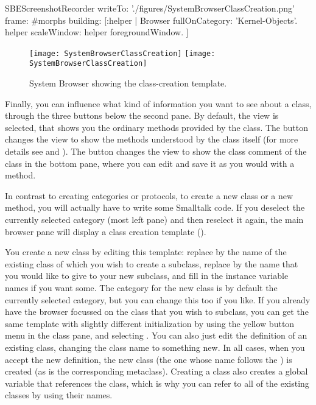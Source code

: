 \documentclass[a4paper,10pt,twoside]{book}
\begin{document}
\begin{ExecuteSmalltalkScript}
SBEScreenshotRecorder writeTo: './figures/SystemBrowserClassCreation.png' frame: #morphs building: [:helper |
	Browser fullOnCategory: 'Kernel-Objects'.
	helper scaleWindow: helper foregroundWindow.
]
\end{ExecuteSmalltalkScript}
\begin{figure}[htbp]
   \centering
   \ifluluelse
	   {\texttt{[image: SystemBrowserClassCreation]}}
	   {\texttt{[image: SystemBrowserClassCreation]}}
   \caption{System Browser showing the class-creation template.
   \label{fig:SystemBrowserClassCreation}}
\end{figure}

Finally, you can influence what kind of information you want to see about a class, through the three buttons below the second pane.
By default, the  view is selected, that shows you the ordinary methods provided by the class.
The  button changes the view to show the methods understood by the class itself (for more details see  and ).
The  button changes the view to show the class comment of the class in the bottom pane, where you can edit and save it as you would with a method.

In contrast to creating categories or protocols, to create a new class or a new method, you will actually have to write some Smalltalk code.
If you deselect the currently selected category (most left pane) and then reselect it again, the main browser pane will display a class creation template ().

You create a new class by editing this template: replace  by the name of the existing class of which you wish to create a subclass, replace  by the name that you would like to give to your new subclass, and fill in the instance variable names if you want some.
The category for the new class is by default the currently selected category, but you can change this too if you like.
If you already have the browser focussed on the class that you wish to subclass, you can get the same template with slightly different
initialization by using the yellow button menu in the class pane, and selecting .
You can also just edit the definition of an existing class, changing the class name to something new.
In all cases, when you accept the new definition, the new class (the one whose name follows the \ct{#}) is created (as is
the corresponding metaclass).
Creating a class also creates a global variable that references the class, which is why you can refer to all of the existing classes by using their names.
\end{document}
